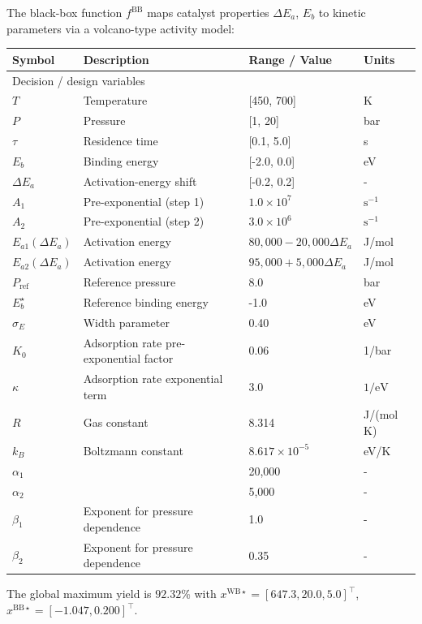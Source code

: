 \documentclass[12pt,a4paper]{article}%
\theoremstyle{plain}%
\theoremstyle{remark}%
\theoremstyle{definition}%
\def\WB{\mathrm{WB}}
\def\BB{\mathrm{BB}}
\begin{document}
\begin{appendices}
The black-box function $f^{\BB}$ maps catalyst properties $\Delta E_a$, $E_b$ to kinetic parameters via a volcano-type activity model:
\begin{table}[htbp]
\begin{tabular}{llll}
    \toprule
    \bf{Symbol} & \bf{Description} & \bf{Range / Value} & \bf{Units} \\
    \midrule
    \multicolumn{4}{l}{Decision / design variables} \\
    \midrule
    $T$ & Temperature & [450, 700] & K \\
    $P$ & Pressure & [1, 20] & bar \\
    $\tau$ & Residence time & [0.1, 5.0] & s \\
    $E_b$ & Binding energy & [-2.0, 0.0] & eV \\
    $\Delta E_a$ & Activation-energy shift & [-0.2, 0.2] & - \\
    \midrule
    $A_1$ & Pre-exponential (step 1) & $1.0 \times 10^7$ & $\mathrm{s}^{-1}$ \\
    $A_2$ & Pre-exponential (step 2) & $3.0 \times 10^6$ & $\mathrm{s}^{-1}$ \\
    $E_{a 1}\left(\Delta E_a\right)$ & Activation energy & $80,000-20,000 \Delta E_a$ & J/mol \\
    $E_{a 2}\left(\Delta E_a\right)$ & Activation energy & $95,000+5,000 \Delta E_a$ & J/mol \\
    $P_{\text {ref }}$ & Reference pressure & 8.0 & bar \\
    $E_b^{\star}$ & Reference binding energy & -1.0 & eV \\
    $\sigma_E$ & Width parameter & 0.40 & eV \\
    $K_0$ & Adsorption rate pre-exponential factor & 0.06 & 1/bar \\
    $\kappa$ & Adsorption rate exponential term & 3.0 & $1 / \mathrm{eV}$ \\
    $R$ & Gas constant & 8.314 & J/(mol K) \\
    $k_B$ & Boltzmann constant & $8.617 \times 10^{-5}$ & eV/K \\
    $\alpha_1$ & & 20,000 & - \\
    $\alpha_2$ & & 5,000 & - \\
    $\beta_1$ & Exponent for pressure dependence & 1.0 & - \\
    $\beta_2$ & Exponent for pressure dependence & 0.35 & - \\
    \bottomrule
\end{tabular}
\end{table}
The global maximum yield is $92.32\%$ with $x^{\WB\star} = [647.3, 20.0, 5.0]^\top$, $x^{\BB\star} = [-1.047, 0.200]^\top$.


\end{appendices}
\end{document}
